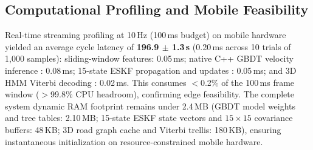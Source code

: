 \documentclass[conference]{IEEEtran}
\begin{document}
\begin{table}[!htbp]
\centering
\caption{Real-World Smartphone On-Road Validation vs.\ RTK Ground Truth (Prayagraj 3.2\,km Urban Corridor, Mean $\pm$ Std.\ Dev.\ over 10 Trials)}
\label{tab:realworld}
\scriptsize
\renewcommand{\arraystretch}{0.95}
\end{table}

\subsection{Computational Profiling and Mobile Feasibility}
Real-time streaming profiling at 10\,Hz (100\,ms budget) on mobile hardware yielded an average cycle latency of \textbf{196.9 $\pm$ 1.3\,\textmu s} (0.20\,ms across 10 trials of 1,000 samples): sliding-window features: 0.05\,ms; native C++ GBDT velocity inference \cite{friedman2001}: 0.08\,ms; 15-state ESKF propagation and updates \cite{sola2017}: 0.05\,ms; and 3D HMM Viterbi decoding \cite{newson2009}: 0.02\,ms. This consumes $<$0.2\% of the 100\,ms frame window ($>$99.8\% CPU headroom), confirming edge feasibility. The complete system dynamic RAM footprint remains under 2.4\,MB (GBDT model weights and tree tables: 2.10\,MB; 15-state ESKF state vectors and $15\times 15$ covariance buffers: 48\,KB; 3D road graph cache and Viterbi trellis: 180\,KB), ensuring instantaneous initialization on resource-constrained mobile hardware.
\end{document}
